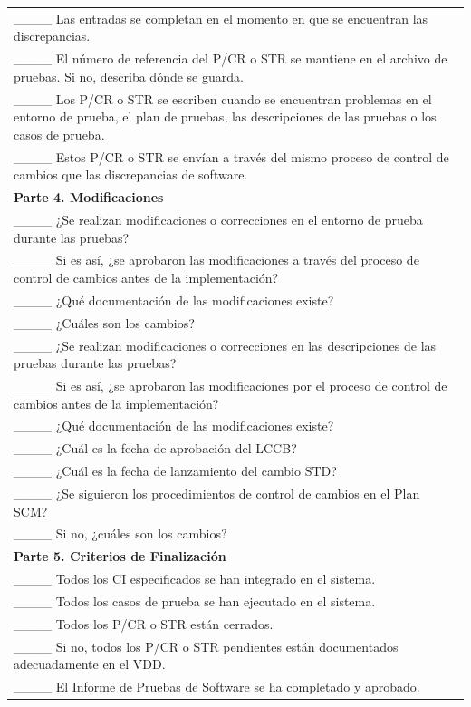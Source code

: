 \begin{table}[H]
\begin{tabular}{|p{14cm}|}
\_\_\_\_ Las entradas se completan en el momento en que se encuentran las discrepancias. \\
\_\_\_\_ El número de referencia del P/CR o STR se mantiene en el archivo de pruebas. Si no, describa dónde se guarda. \\
\_\_\_\_ Los P/CR o STR se escriben cuando se encuentran problemas en el entorno de prueba, el plan de pruebas, las descripciones de las pruebas o los casos de prueba. \\
\_\_\_\_ Estos P/CR o STR se envían a través del mismo proceso de control de cambios que las discrepancias de software. \\
\textbf{Parte 4. Modificaciones} \\
\_\_\_\_ ¿Se realizan modificaciones o correcciones en el entorno de prueba durante las pruebas? \\
\_\_\_\_ Si es así, ¿se aprobaron las modificaciones a través del proceso de control de cambios antes de la implementación? \\
\_\_\_\_ ¿Qué documentación de las modificaciones existe? \\
\_\_\_\_ ¿Cuáles son los cambios? \\
\_\_\_\_ ¿Se realizan modificaciones o correcciones en las descripciones de las pruebas durante las pruebas? \\
\_\_\_\_ Si es así, ¿se aprobaron las modificaciones por el proceso de control de cambios antes de la implementación? \\
\_\_\_\_ ¿Qué documentación de las modificaciones existe? \\
\_\_\_\_ ¿Cuál es la fecha de aprobación del LCCB? \\
\_\_\_\_ ¿Cuál es la fecha de lanzamiento del cambio STD? \\
\_\_\_\_ ¿Se siguieron los procedimientos de control de cambios en el Plan SCM? \\
\_\_\_\_ Si no, ¿cuáles son los cambios? \\
\textbf{Parte 5. Criterios de Finalización} \\
\_\_\_\_ Todos los CI especificados se han integrado en el sistema. \\
\_\_\_\_ Todos los casos de prueba se han ejecutado en el sistema. \\
\_\_\_\_ Todos los P/CR o STR están cerrados. \\
\_\_\_\_ Si no, todos los P/CR o STR pendientes están documentados adecuadamente en el VDD. \\
\_\_\_\_ El Informe de Pruebas de Software se ha completado y aprobado. \\

\end{tabular}
\end{table}
